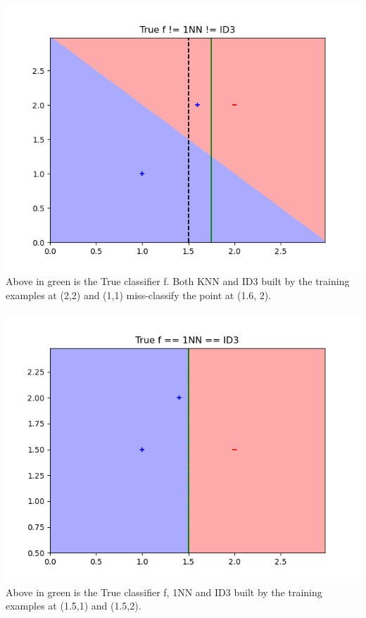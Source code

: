 \documentclass[12pt]{article}
\begin{document}
\newpage
{}\\
\includegraphics[scale=0.5]{hw3/plots/v3.PNG}\\
Above in green is the True classifier f. Both KNN and ID3 built by the training examples at (2,2) and (1,1) miss-classify the point at (1.6, 2).\\ 
\newpage
{}\\
\includegraphics[scale=0.5]{hw3/plots/v4.PNG}\\
Above in green is the True classifier f, 1NN and ID3 built by the training examples at (1.5,1) and (1.5,2).\\ 
\end{document}
